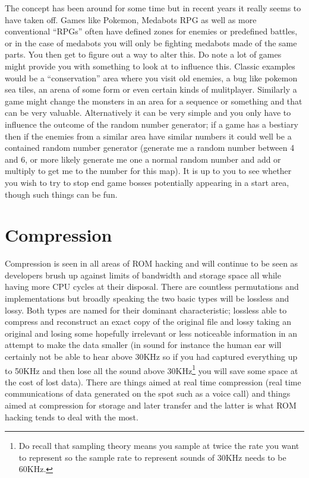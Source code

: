 \documentclass[
]{book}
\begin{document}
The concept has been around for some time but in recent years it really seems to have taken off. Games like Pokemon, Medabots RPG as well as more conventional ``RPGs'' often have defined zones for enemies or predefined battles, or in the case of medabots you will only be fighting medabots made of the same parts. You then get to figure out a way to alter this. Do note a lot of games might provide you with something to look at to influence this. Classic examples would be a ``conservation'' area where you visit old enemies, a bug like pokemon sea tiles, an arena of some form or even certain kinds of mulitplayer. Similarly a game might change the monsters in an area for a sequence or something and that can be very valuable. Alternatively it can be very simple and you only have to influence the outcome of the random number generator; if a game has a bestiary then if the enemies from a similar area have similar numbers it could well be a contained random number generator (generate me a random number between 4 and 6, or more likely generate me one a normal random number and add or multiply to get me to the number for this map). It is up to you to see whether you wish to try to stop end game bosses potentially appearing in a start area, though such things can be fun.

\hypertarget{compression-1}{%
\section{Compression}\label{compression-1}}

Compression is seen in all areas of ROM hacking and will continue to be seen as developers brush up against limits of bandwidth and storage space all while having more CPU cycles at their disposal. There are countless permutations and implementations but broadly speaking the two basic types will be lossless and lossy. Both types are named for their dominant characteristic; lossless able to compress and reconstruct an exact copy of the original file and lossy taking an original and losing some hopefully irrelevant or less noticeable information in an attempt to make the data smaller (in sound for instance the human ear will certainly not be able to hear above 30KHz so if you had captured everything up to 50KHz and then lose all the sound above 30KHz\footnote{Do recall that sampling theory means you sample at twice the rate you want to represent so the sample rate to represent sounds of 30KHz needs to be 60KHz.} you will save some space at the cost of lost data). There are things aimed at real time compression (real time communications of data generated on the spot such as a voice call) and things aimed at compression for storage and later transfer and the latter is what ROM hacking tends to deal with the most.
\end{document}
